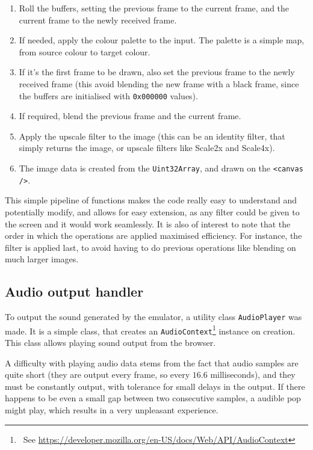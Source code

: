 \documentclass[11pt]{report}
\newcommand{\ftnt}[1]{\footnote{~See \url{#1}}}
\begin{document}
\begin{enumerate}[itemsep=0mm]
	\item Roll the buffers, setting the previous frame to the current frame, and the current frame to the newly received frame.
	\item If needed, apply the colour palette to the input. The palette is a simple map, from source colour to target colour.
	\item If it's the first frame to be drawn, also set the previous frame to the newly received frame (this avoid blending the new frame with a black frame, since the buffers are initialised with \texttt{0x000000} values).
	\item If required, blend the previous frame and the current frame.
	\item Apply the upscale filter to the image (this can be an identity filter, that simply returns the image, or upscale filters like Scale2x and Scale4x).
	\item The image data is created from the \texttt{Uint32Array}, and drawn on the \texttt{<canvas />}.
\end{enumerate}

This simple pipeline of functions makes the code really easy to understand and potentially modify, and allows for easy extension, as any filter could be given to the screen and it would work seamlessly. It is also of interest to note that the order in which the operations are applied maximised efficiency. For instance, the filter is applied last, to avoid having to do previous operations like blending on much larger images.

\subsection{Audio output handler}

To output the sound generated by the emulator, a utility class \texttt{AudioPlayer} was made. It is a simple class, that creates an \texttt{AudioContext}\ftnt{https://developer.mozilla.org/en-US/docs/Web/API/AudioContext} instance on creation. This class allows playing sound output from the browser.

A difficulty with playing audio data stems from the fact that audio samples are quite short (they are output every frame, so every $16.6$ milliseconds), and they must be constantly output, with tolerance for small delays in the output. If there happens to be even a small gap between two consecutive samples, a audible pop might play, which results in a very unpleasant experience.
\end{document}
